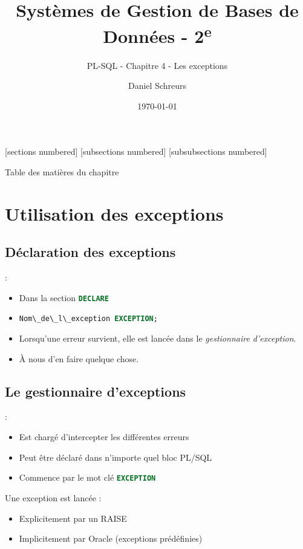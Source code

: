 \documentclass[10pt]{beamer}
\title{Systèmes de Gestion de Bases de Données - 2\textsuperscript{e}}
\subtitle{PL-SQL - Chapitre 4 - Les exceptions}
\date{\today}
\author{Daniel Schreurs}
\institute{Haute École de Province de Liège}
\begin{document}
\maketitle

[sections numbered]
[subsections numbered]
[subsubsections numbered]
\begin{frame}[allowframebreaks]{Table des matières du chapitre}
    \tableofcontents[subsectionstyle=show/show/hide,subsubsectionstyle=show/show/hide,]
\end{frame}

\section{Utilisation des exceptions}
\tocss
\subsection{Déclaration des exceptions}
\begin{frame}{\secname : \subsecname}
    \begin{itemize}
        \item Dans la section \lstinline[language=sql]!DECLARE!
        \item \lstinline[language=sql]!Nom\_de\_l\_exception EXCEPTION;!
        \item Lorsqu'une erreur survient, elle est lancée dans le \emph{gestionnaire d'exception}.
        \item À nous d'en faire quelque chose.
    \end{itemize}
\end{frame}

\subsection{Le gestionnaire d'exceptions}
\begin{frame}{\secname : \subsecname}
    \begin{itemize}
        \item Est chargé d'intercepter les différentes erreurs
        \item Peut être déclaré dans n'importe quel bloc PL/SQL
        \item Commence par le mot clé \lstinline[language=sql]!EXCEPTION!
    \end{itemize}
    Une exception est lancée :
    \begin{itemize}
        \item Explicitement par un RAISE
        \item Implicitement par Oracle (exceptions prédéfinies)
    \end{itemize}
\end{frame}
\end{document}
